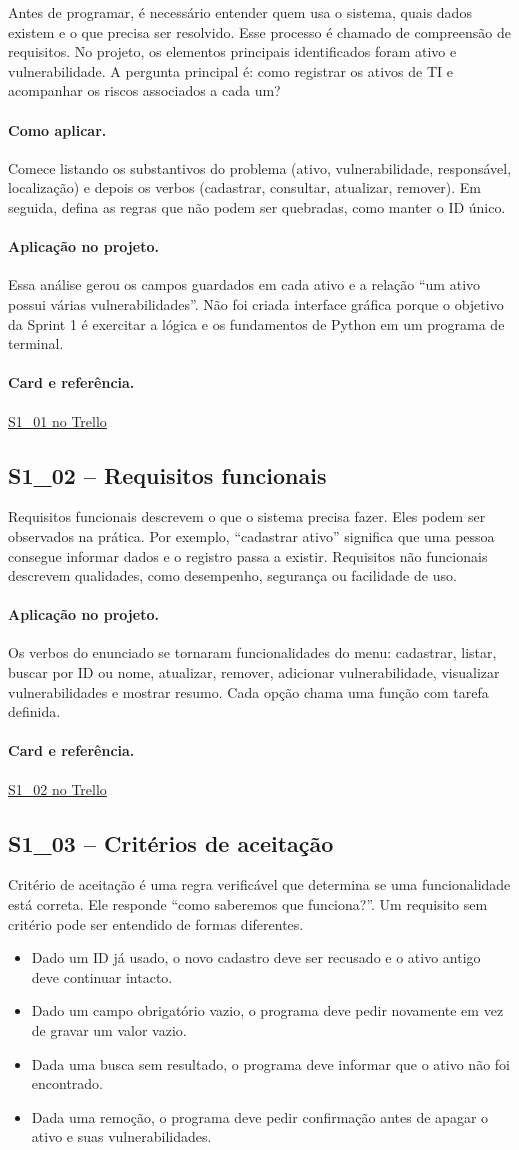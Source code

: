 \documentclass[11pt,a4paper]{article}
\newcommand{\projeto}{\paragraph{Aplicação no projeto.}}
\newcommand{\comoaplicar}{\paragraph{Como aplicar.}}
\newcommand{\referencia}[2]{\paragraph{Card e referência.}\href{#1}{#2}}
\newcommand{\cardsection}[1]{\Needspace{12\baselineskip}\subsection{#1}}
\begin{document}
Antes de programar, é necessário entender quem usa o sistema, quais dados existem e o que precisa ser resolvido. Esse processo é chamado de compreensão de requisitos. No projeto, os elementos principais identificados foram ativo e vulnerabilidade. A pergunta principal é: como registrar os ativos de TI e acompanhar os riscos associados a cada um?

\comoaplicar
Comece listando os substantivos do problema (ativo, vulnerabilidade, responsável, localização) e depois os verbos (cadastrar, consultar, atualizar, remover). Em seguida, defina as regras que não podem ser quebradas, como manter o ID único.

\projeto
Essa análise gerou os campos guardados em cada ativo e a relação ``um ativo possui várias vulnerabilidades''. Não foi criada interface gráfica porque o objetivo da Sprint 1 é exercitar a lógica e os fundamentos de Python em um programa de terminal.

\referencia{https://trello.com/c/2nV6OG9q}{S1\_01 no Trello}

\cardsection{S1\_02 -- Requisitos funcionais}

Requisitos funcionais descrevem o que o sistema precisa fazer. Eles podem ser observados na prática. Por exemplo, ``cadastrar ativo'' significa que uma pessoa consegue informar dados e o registro passa a existir. Requisitos não funcionais descrevem qualidades, como desempenho, segurança ou facilidade de uso.

\projeto
Os verbos do enunciado se tornaram funcionalidades do menu: cadastrar, listar, buscar por ID ou nome, atualizar, remover, adicionar vulnerabilidade, visualizar vulnerabilidades e mostrar resumo. Cada opção chama uma função com tarefa definida.

\referencia{https://trello.com/c/nPnrvQad}{S1\_02 no Trello}

\cardsection{S1\_03 -- Critérios de aceitação}

Critério de aceitação é uma regra verificável que determina se uma funcionalidade está correta. Ele responde ``como saberemos que funciona?''. Um requisito sem critério pode ser entendido de formas diferentes.

\begin{itemize}
  \item Dado um ID já usado, o novo cadastro deve ser recusado e o ativo antigo deve continuar intacto.
  \item Dado um campo obrigatório vazio, o programa deve pedir novamente em vez de gravar um valor vazio.
  \item Dada uma busca sem resultado, o programa deve informar que o ativo não foi encontrado.
  \item Dada uma remoção, o programa deve pedir confirmação antes de apagar o ativo e suas vulnerabilidades.
\end{itemize}
\end{document}
